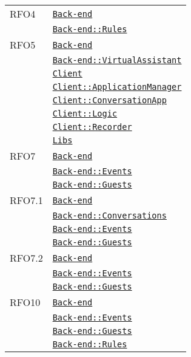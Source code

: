 \begin{longtable}{|>{\centering}m{3cm}|m{10cm}<{\centering}|}
RFO4 & \hyperref[Back-end]{\texttt{Back-end}}\\
& \hyperref[Back-end::Rules]{\texttt{Back-end::Rules}}\\ \hline

RFO5 & \hyperref[Back-end]{\texttt{Back-end}}\\
& \hyperref[Back-end::VirtualAssistant]{\texttt{Back-end::VirtualAssistant}}\\
& \hyperref[Client]{\texttt{Client}}\\
& \hyperref[Client::ApplicationManager]{\texttt{Client::ApplicationManager}}\\
& \hyperref[Client::ConversationApp]{\texttt{Client::ConversationApp}}\\
& \hyperref[Client::Logic]{\texttt{Client::Logic}}\\
& \hyperref[Client::Recorder]{\texttt{Client::Recorder}}\\
& \hyperref[Libs]{\texttt{Libs}}\\ \hline

RFO7 & \hyperref[Back-end]{\texttt{Back-end}}\\
& \hyperref[Back-end::Events]{\texttt{Back-end::Events}}\\
& \hyperref[Back-end::Guests]{\texttt{Back-end::Guests}}\\ \hline

RFO7.1 & \hyperref[Back-end]{\texttt{Back-end}}\\
& \hyperref[Back-end::Conversations]{\texttt{Back-end::Conversations}}\\
& \hyperref[Back-end::Events]{\texttt{Back-end::Events}}\\
& \hyperref[Back-end::Guests]{\texttt{Back-end::Guests}}\\ \hline

RFO7.2 & \hyperref[Back-end]{\texttt{Back-end}}\\
& \hyperref[Back-end::Events]{\texttt{Back-end::Events}}\\
& \hyperref[Back-end::Guests]{\texttt{Back-end::Guests}}\\ \hline

RFO10 & \hyperref[Back-end]{\texttt{Back-end}}\\
& \hyperref[Back-end::Events]{\texttt{Back-end::Events}}\\
& \hyperref[Back-end::Guests]{\texttt{Back-end::Guests}}\\
& \hyperref[Back-end::Rules]{\texttt{Back-end::Rules}}\\ \hline


\end{longtable}
